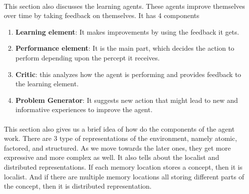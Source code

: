 \documentclass{article}
\begin{document}
  \paragraph{}
  This section also discusses the learning agents. These agents improve themselves over time by taking feedback on themselves. 
  It has 4 components
  \begin{enumerate}
    \item \textbf{Learning element}: It makes improvements by using the feedback it gets.
    \item \textbf{Performance element}: It is the main part, which decides the action to perform depending upon the percept it receives.
    \item \textbf{Critic}: this analyzes how the agent is performing and provides feedback to the learning element.
    \item \textbf{Problem Generator}: It suggests new action that might lead to new and informative experiences to improve the agent.
  \end{enumerate}
  
  \paragraph{}
  This section also gives us a brief idea of how do the components of the agent work. 
  There are 3 type of representations of the environment, namely atomic, factored, and structured. 
  As we move towards the later ones, they get more expressive and more complex as well. 
  It also tells about the localist and distributed representations. 
  If each memory location stores a concept, then it is localist. 
  And if there are multiple memory locations all storing different parts of the concept, then it is distributed representation.
\end{document}
